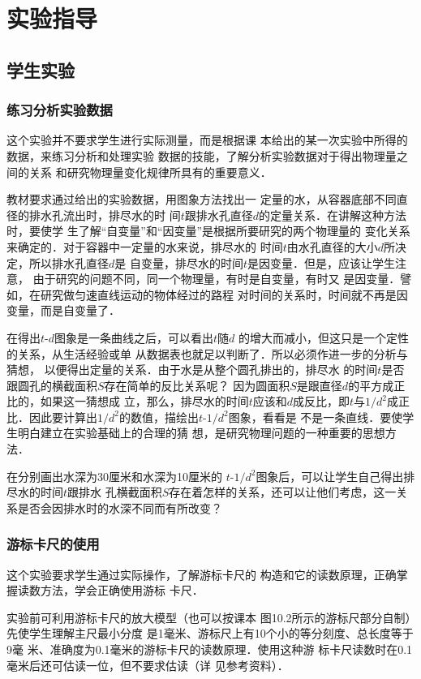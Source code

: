 \section{实验指导}
\subsection{学生实验}
\subsubsection{练习分析实验数据}
这个实验并不要求学生进行实际测量，而是根据课
本给出的某一次实验中所得的数据，来练习分析和处理实验
数据的技能，了解分析实验数据对于得出物理量之间的关系
和研究物理量变化规律所具有的重要意义．

教材要求通过给出的实验数据，用图象方法找出一
定量的水，从容器底部不同直径的排水孔流出时，排尽水的时
间$t$跟排水孔直径$d$的定量关系．在讲解这种方法时，要使学
生了解“自变量”和“因变量”是根据所要研究的两个物理量的
变化关系来确定的．对于容器中一定量的水来说，排尽水的
时间$t$由水孔直径的大小$d$所决定，所以排水孔直径$d$是
自变量，排尽水的时间$t$是因变量．但是，应该让学生注意，
由于研究的问题不同，同一个物理量，有时是自变量，有时又
是因变量．譬如，在研究做匀速直线运动的物体经过的路程
对时间的关系时，时间就不再是因变量，而是自变量了．

在得出$t$-$d$图象是一条曲线之后，可以看出$t$随$d$
的增大而减小，但这只是一个定性的关系，从生活经验或单
从数据表也就足以判断了．所以必须作进一步的分析与猜想，
以便得出定量的关系．由于水是从整个圆孔排出的，排尽水
的时间$t$是否跟圆孔的横截面积$S$存在简单的反比关系呢？
因为圆面积$S$是跟直径$d$的平方成正比的，如果这一猜想成
立，那么，排尽水的时间$t$应该和$d$成反比，即$t$与$1/d^2$成正
比．因此要计算出$1/d^2$的数值，描绘出$t$-$1/d^2$图象，看看是
不是一条直线．要使学生明白建立在实验基础上的合理的猜
想，是研究物理问题的一种重要的思想方法．

在分别画出水深为30厘米和水深为10厘米的
$t$-$1/d^2$图象后，可以让学生自己得出排尽水的时间$t$跟排水
孔横截面积$S$存在着怎样的关系，还可以让他们考虑，这一关
系是否会因排水时的水深不同而有所改变？

\subsubsection{游标卡尺的使用}

这个实验要求学生通过实际操作，了解游标卡尺的
构造和它的读数原理，正确掌握读数方法，学会正确使用游标
卡尺．

实验前可利用游标卡尺的放大模型（也可以按课本
图10.2所示的游标尺部分自制）先使学生理解主尺最小分度
是1毫米、游标尺上有10个小的等分刻度、总长度等于9毫
米、准确度为0.1毫米的游标卡尺的读数原理．使用这种游
标卡尺读数时在0.1毫米后还可估读一位，但不要求估读（详
见参考资料）．

